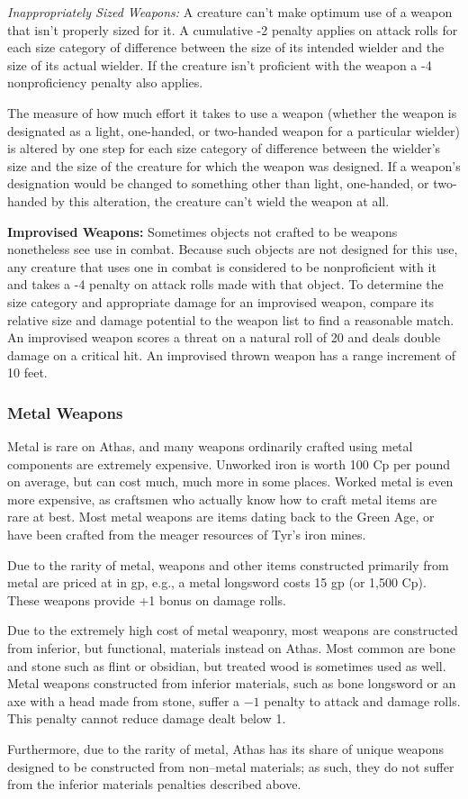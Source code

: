 \textit{Inappropriately Sized Weapons:} A creature can't make optimum use of a weapon that isn't properly sized for it. A cumulative -2 penalty applies on attack rolls for each size category of difference between the size of its intended wielder and the size of its actual wielder. If the creature isn't proficient with the weapon a -4 nonproficiency penalty also applies.

The measure of how much effort it takes to use a weapon (whether the weapon is designated as a light, one-handed, or two-handed weapon for a particular wielder) is altered by one step for each size category of difference between the wielder's size and the size of the creature for which the weapon was designed. If a weapon's designation would be changed to something other than light, one-handed, or two-handed by this alteration, the creature can't wield the weapon at all.

\textbf{Improvised Weapons:} Sometimes objects not crafted to be weapons nonetheless see use in combat. Because such objects are not designed for this use, any creature that uses one in combat is considered to be nonproficient with it and takes a -4 penalty on attack rolls made with that object. To determine the size category and appropriate damage for an improvised weapon, compare its relative size and damage potential to the weapon list to find a reasonable match. An improvised weapon scores a threat on a natural roll of 20 and deals double damage on a critical hit. An improvised thrown weapon has a range increment of 10 feet.

\subsubsection{Metal Weapons}
Metal is rare on Athas, and many weapons ordinarily crafted using metal components are extremely expensive. Unworked iron is worth 100 Cp per pound on average, but can cost much, much more in some places. Worked metal is even more expensive, as craftsmen who actually know how to craft metal items are rare at best. Most metal weapons are items dating back to the Green Age, or have been crafted from the meager resources of Tyr's iron mines.

Due to the rarity of metal, weapons and other items constructed primarily from metal are priced at in gp, e.g., a metal longsword costs 15 gp (or 1,500 Cp). These weapons provide +1 bonus on damage rolls.

Due to the extremely high cost of metal weaponry, most weapons are constructed from inferior, but functional, materials instead on Athas. Most common are bone and stone such as flint or obsidian, but treated wood is sometimes used as well. Metal weapons constructed from inferior materials, such as bone longsword or an axe with a head made from stone, suffer a $-1$ penalty to attack and damage rolls. This penalty cannot reduce damage dealt below 1.

Furthermore, due to the rarity of metal, Athas has its share of unique weapons designed to be constructed from non–metal materials; as such, they do not suffer from the inferior materials penalties described above.